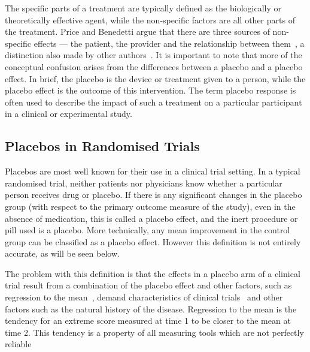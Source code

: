 The specific parts of a treatment are typically defined as the biologically or theoretically effective agent, while the non-specific factors are all other parts of the treatment. Price and Benedetti argue that there are three sources of non-specific effects --- the patient, the provider and the relationship between them~\cite{Price2008}, a distinction also made by other authors~\cite{Finniss2005,DiBlasi2002}. It is important to note that more of the conceptual confusion arises from the differences between a placebo and a placebo effect. In brief, the placebo is the device or treatment given to a person, while the placebo effect is the outcome of this intervention. The term placebo response is often used to describe the impact of such a treatment on a particular participant in a clinical or experimental study. 


\subsection{Placebos in Randomised Trials}
\label{sec:plac-rand-trials}

Placebos are most well known for their use in a clinical trial setting. %
In a typical randomised trial, neither patients nor physicians know whether a particular person receives drug or placebo.  If there is any significant changes in the placebo group (with respect to the primary outcome measure of the study), even in the absence of medication, this is called a placebo effect, and the inert procedure or pill used is a placebo. More technically, any mean improvement in the control group can be classified as a placebo effect. However this definition is not entirely accurate, as will be seen below.   


The problem with this definition is that the effects in a placebo arm of a clinical trial result from a combination of the placebo effect and other factors, such as regression to the mean~\cite{Morton2003}, demand characteristics of clinical trials~\cite{hrobjartsson2001,weber1972subject} and other factors such as the natural history of the disease. Regression to the mean is the tendency for an extreme score measured at time 1 to be closer to the mean at time 2. This tendency is a property of all measuring tools which are not perfectly reliable \cite{Morton2003}

